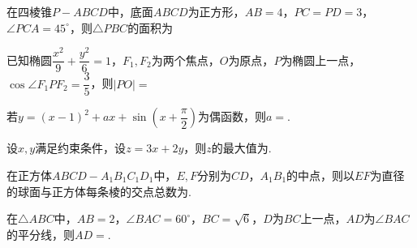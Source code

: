 \documentclass[a4paper,11pt]{report}
\begin{document}
\begin{examquestions}
\item 在四棱锥$P-ABCD$中，底面$ABCD$为正方形，$AB=4$，$PC=PD=3$，$\angle PCA=45^\circ$，则$\triangle PBC$的面积为

\item 已知椭圆$\dfrac{x^2}{9}+\dfrac{y^2}{6}=1$，$F_1,F_2$为两个焦点，$O$为原点，$P$为椭圆上一点，$\cos\angle F_1PF_2=\dfrac35$，则$|PO|=$
\end{examquestions}

\begin{examquestions}[start=13]
\item 若$y=(x-1)^2+ax+\sin\left(x+\dfrac\pi2\right)$为偶函数，则$a=$\blank. 
\item 设$x,y$满足约束条件，设$z=3x+2y$，则$z$的最大值为\blank. 
\item 在正方体$ABCD-A_1B_1C_1D_1$中，$E,F$分别为$CD$，$A_1B_1$的中点，则以$EF$为直径的球面与正方体每条棱的交点总数为\blank. 
\item 在$\triangle ABC$中，$AB=2$，$\angle BAC=60^\circ$，$BC=\sqrt6$，$D$为$BC$上一点，$AD$为$\angle BAC$的平分线，则$AD=$\blank. 
\end{examquestions}
\end{document}
